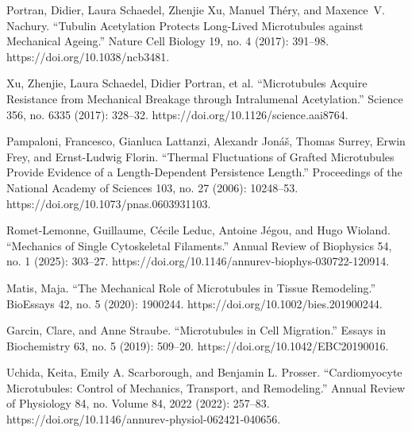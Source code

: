 \begin{thebibliography}{00}
Portran, Didier, Laura Schaedel, Zhenjie Xu, Manuel Théry, and Maxence V. Nachury. “Tubulin Acetylation Protects Long-Lived Microtubules against Mechanical Ageing.” Nature Cell Biology 19, no. 4 (2017): 391–98. https://doi.org/10.1038/ncb3481. %

\bibitem[]{}
Xu, Zhenjie, Laura Schaedel, Didier Portran, et al. “Microtubules Acquire Resistance from Mechanical Breakage through Intralumenal Acetylation.” Science 356, no. 6335 (2017): 328–32. https://doi.org/10.1126/science.aai8764. %

\bibitem[]{}
Pampaloni, Francesco, Gianluca Lattanzi, Alexandr Jonáš, Thomas Surrey, Erwin Frey, and Ernst-Ludwig Florin. “Thermal Fluctuations of Grafted Microtubules Provide Evidence of a Length-Dependent Persistence Length.” Proceedings of the National Academy of Sciences 103, no. 27 (2006): 10248–53. https://doi.org/10.1073/pnas.0603931103. %



\bibitem[]{}
Romet-Lemonne, Guillaume, Cécile Leduc, Antoine Jégou, and Hugo Wioland. “Mechanics of Single Cytoskeletal Filaments.” Annual Review of Biophysics 54, no. 1 (2025): 303–27. https://doi.org/10.1146/annurev-biophys-030722-120914. %

\bibitem[]{}
Matis, Maja. “The Mechanical Role of Microtubules in Tissue Remodeling.” BioEssays 42, no. 5 (2020): 1900244. https://doi.org/10.1002/bies.201900244. %

\bibitem[]{}
Garcin, Clare, and Anne Straube. “Microtubules in Cell Migration.” Essays in Biochemistry 63, no. 5 (2019): 509–20. https://doi.org/10.1042/EBC20190016. %


Uchida, Keita, Emily A. Scarborough, and Benjamin L. Prosser. “Cardiomyocyte Microtubules: Control of Mechanics, Transport, and Remodeling.” Annual Review of Physiology 84, no. Volume 84, 2022 (2022): 257–83. https://doi.org/10.1146/annurev-physiol-062421-040656. %


\end{thebibliography}
